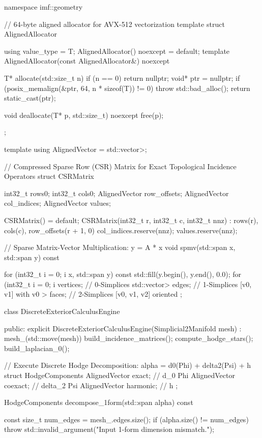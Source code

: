 \documentclass[11pt,twoside,openright]{amsbook}
\begin{document}
namespace imf::geometry {

// 64-byte aligned allocator for AVX-512 vectorization
template 
struct AlignedAllocator {
    using value_type = T;
    AlignedAllocator() noexcept = default;
    template  AlignedAllocator(const AlignedAllocator&) noexcept {}

    T* allocate(std::size_t n) {
        if (n == 0) return nullptr;
        void* ptr = nullptr;
        if (posix_memalign(&ptr, 64, n * sizeof(T)) != 0) {
            throw std::bad_alloc();
        }
        return static_cast(ptr);
    }

    void deallocate(T* p, std::size_t) noexcept {
        free(p);
    }
};

template 
using AlignedVector = std::vector>;

// Compressed Sparse Row (CSR) Matrix for Exact Topological Incidence Operators
struct CSRMatrix {
    int32_t rows{0};
    int32_t cols{0};
    AlignedVector row_offsets;
    AlignedVector col_indices;
    AlignedVector values;

    CSRMatrix() = default;
    CSRMatrix(int32_t r, int32_t c, int32_t nnz)
        : rows(r), cols(c), row_offsets(r + 1, 0) {
        col_indices.reserve(nnz);
        values.reserve(nnz);
    }

    // Sparse Matrix-Vector Multiplication: y = A * x
    void spmv(std::span x, std::span y) const {
        for (int32_t i = 0; i  x, std::span y) const {
        std::fill(y.begin(), y.end(), 0.0);
        for (int32_t i = 0; i  vertices;               // 0-Simplices
    std::vector> edges;     // 1-Simplices [v0, v1] with v0 > faces;     // 2-Simplices [v0, v1, v2] oriented
};

class DiscreteExteriorCalculusEngine {
public:
    explicit DiscreteExteriorCalculusEngine(Simplicial2Manifold mesh)
        : mesh_(std::move(mesh)) {
        build_incidence_matrices();
        compute_hodge_stars();
        build_laplacian_0();
    }

    // Execute Discrete Hodge Decomposition: alpha = d0(Phi) + delta2(Psi) + h
    struct HodgeComponents {
        AlignedVector exact;      // d_0 Phi
        AlignedVector coexact;    // delta_2 Psi
        AlignedVector harmonic;   // h
    };

    HodgeComponents decompose_1form(std::span alpha) const {
        const size_t num_edges = mesh_.edges.size();
        if (alpha.size() != num_edges) {
            throw std::invalid_argument("Input 1-form dimension mismatch.");
        }

}}}}}
\end{document}
